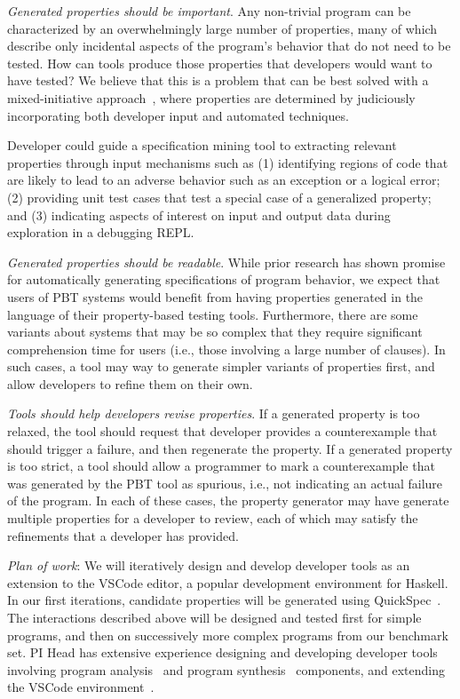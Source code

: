 \textit{Generated properties should be \emph{important}}. Any non-trivial
program can be characterized by an overwhelmingly large number of properties,
many of which describe only incidental aspects of the program's behavior that do
not need to be tested. How can tools produce those properties that developers
would want to have tested? We believe that this is a problem that can be best
solved with a mixed-initiative approach~\cite{allen1999mixed}, where properties
are determined by judiciously incorporating both developer input and automated
techniques.

Developer could guide a specification mining tool to extracting relevant
properties through input mechanisms such as (1) identifying regions of code that
are likely to lead to an adverse behavior such as an exception or a logical
error; (2) providing unit test cases that test a special case of a generalized
property; and (3) indicating aspects of interest on input and output data during
exploration in a debugging REPL.

\textit{Generated properties should be \emph{readable}}. While prior research
has shown promise for automatically generating specifications of program
behavior, we expect that users of PBT systems would benefit from having
properties generated in the language of their property-based testing tools.
Furthermore, there are some variants about systems that may be so complex that
they require significant comprehension time for users (i.e., those involving a
large number of clauses). In such cases, a tool may way to generate simpler
variants of properties first, and allow developers to refine them on their own.

\textit{Tools should help developers \emph{revise} properties}. If a generated
property is too relaxed, the tool should request that developer provides a
counterexample that should trigger a failure, and then regenerate the property.
If a generated property is too strict, a tool should allow a programmer to mark
a counterexample that was generated by the PBT tool as spurious, i.e., not
indicating an actual failure of the program. In each of these cases, the
property generator may have generate multiple properties for a developer to
review, each of which may satisfy the refinements that a developer has provided.

\textit{Plan of work}: We will iteratively design and develop developer tools as
an extension to the VSCode editor, a popular development environment for
Haskell. In our first iterations, candidate properties will be generated using
QuickSpec~\cite{claessen2010quickspec}. The interactions described above will be
designed and tested first for simple programs, and then on successively more
complex programs from our benchmark set. PI Head has extensive experience
designing and developing developer tools involving program
analysis~\cite{head2018interactive,head2019managing} and program
synthesis~\cite{head2017writing} components, and extending the VSCode
environment~\cite{head2020composing}.   

